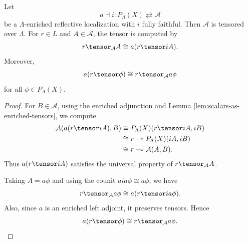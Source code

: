 \begin{lemma}
\label{lem:tensors-in-reflective-localization}
Let
\[
    a\dashv i:
    P_\Lambda(X)\rightleftarrows\mathcal A
\]
be a \(\Lambda\)-enriched reflective localization with \(i\) fully faithful. Then
\(\mathcal A\) is tensored over \(\Lambda\). For \(r\in L\) and \(A\in\mathcal A\),
the tensor is computed by
\[
    r\tensor_{\mathcal A}A
    \cong
    a(r\tensor iA).
\]
Moreover,
\[
    a(r\tensor\phi)
    \cong
    r\tensor_{\mathcal A}a\phi
\]
for all \(\phi\in P_\Lambda(X)\).
\end{lemma}

\begin{proof}
For \(B\in\mathcal A\), using the enriched adjunction and Lemma
\ref{lem:scalars-as-enriched-tensors}, we compute
\[
\begin{aligned}
\mathcal A(a(r\tensor iA),B)
&\cong
P_\Lambda(X)(r\tensor iA,iB)
\\
&\cong
r\multimap P_\Lambda(X)(iA,iB)
\\
&\cong
r\multimap \mathcal A(A,B).
\end{aligned}
\]
Thus \(a(r\tensor iA)\) satisfies the universal property of
\(r\tensor_{\mathcal A}A\).

Taking \(A=a\phi\) and using the counit \(aia\phi\cong a\phi\), we have
\[
    r\tensor_{\mathcal A}a\phi
    \cong
    a(r\tensor ia\phi).
\]
Also, since \(a\) is an enriched left adjoint, it preserves tensors. Hence
\[
    a(r\tensor\phi)
    \cong
    r\tensor_{\mathcal A}a\phi.
\]
\end{proof}

